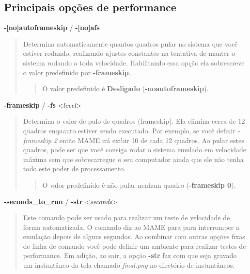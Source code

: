 \documentclass[letterpaper,10pt,brazil]{sphinxmanual}
\begin{document}
\subsection{Principais opções de performance}
\label{commandline/commandline-all:principais-opcoes-de-performance}\label{commandline/commandline-all:mame-commandline-noautoframeskip}
\textbf{-{[}no{]}autoframeskip} / \textbf{-{[}no{]}afs}
\begin{quote}

Determina automaticamente quantos quadros pular no sistema que você
estiver rodando, realizando ajustes constantes na tentativa de
manter o sistema rodando a toda velocidade. Habilitando essa opção
ela sobrescreve o valor predefinido por \textbf{-frameskip}.
\begin{quote}

O valor predefinido é \textbf{Desligado} (\textbf{-noautoframeskip}).
\end{quote}
\end{quote}
\label{commandline/commandline-all:mame-commandline-frameskip}
\textbf{-frameskip} / \textbf{-fs} \textless{}\emph{level}\textgreater{}
\begin{quote}

Determina o valor de pulo de quadros (frameskip). Ela elimina
cerca de 12 quadros enquanto estiver sendo executado. Por exemplo,
se você definir \emph{-frameskip 2} então MAME irá exibir 10 de cada 12
quadros. Ao pular estes quadros, pode ser que você consiga rodar
o sistema emulado em velocidade máxima sem que sobrecarregue o
seu computador ainda que ele não tenha todo este poder de
processamento.
\begin{quote}

O valor predefinido é não pular nenhum quadro
(\textbf{-frameskip 0}).
\end{quote}
\end{quote}
\label{commandline/commandline-all:mame-commandline-secondstorun}
\textbf{-seconds\_to\_run} / \textbf{-str} \textless{}\emph{seconds}\textgreater{}
\begin{quote}

Este comando pode ser usado para realizar um teste de velocidade de
forma automatizada. O comando diz ao MAME para para interromper a
emulação depois de alguns segundos. Ao combinar com outras opções
fixas de linha de comando você pode definir um ambiente para
realizar testes de performance. Em adição, ao sair, a opção \textbf{-str}
faz com que seja gravado um instantâneo da tela chamado \emph{final.png}
no diretório de instantâneos.
\end{quote}
\end{document}
